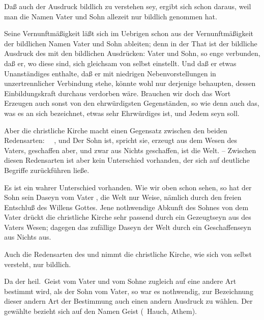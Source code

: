 \begin{aufza}
\item Daß auch der Ausdruck  bildlich zu verstehen sey, ergibt sich schon daraus, weil man die Namen Vater und Sohn allezeit nur bildlich genommen hat.
\item Seine Vernunftmäßigkeit läßt sich im Uebrigen schon aus der Vernunftmäßigkeit der bildlichen Namen Vater und Sohn ableiten; denn in der That ist der bildliche Ausdruck des  mit den bildlichen Ausdrücken: Vater und Sohn, so enge verbunden, daß er, wo diese sind, sich gleichsam von selbst einstellt. Und daß er etwas Unanständiges enthalte, daß er mit niedrigen Nebenvorstellungen in unzertrennlicher Verbindung stehe, könnte wohl nur derjenige behaupten, dessen Einbildungskraft durchaus verdorben wäre. Brauchen wir doch das Wort Erzeugen auch sonst von den ehrwürdigsten Gegenständen, so wie denn auch das, was es an sich bezeichnet, etwas sehr Ehrwürdiges ist, und Jedem seyn soll.
\end{aufza}\par
{} Aber die christliche Kirche macht einen Gegensatz zwischen den beiden Redensarten: ~\ , und  Der Sohn ist, spricht sie, erzeugt aus dem Wesen des Vaters, geschaffen aber, und zwar aus Nichts geschaffen, ist die Welt. -- Zwischen diesen Redensarten ist aber kein Unterschied vorhanden, der sich auf deutliche Begriffe zurückführen ließe.\par
{} Es ist ein wahrer Unterschied vorhanden. Wie wir oben schon sehen, so hat der Sohn sein Daseyn vom Vater , die Welt nur  Weise, nämlich durch den freien Entschluß des Willens Gottes. Jene nothwendige Abkunft des Sohnes von dem Vater drückt die christliche Kirche sehr passend durch ein Gezeugtseyn aus des Vaters Wesen; dagegen das zufällige Daseyn der Welt durch ein Geschaffenseyn aus Nichts aus.

\begin{aufza}
\item Auch die Redensarten des  und  nimmt die christliche Kirche, wie sich von selbst versteht, nur bildlich.
\item Da der heil.\ Geist vom Vater und vom Sohne zugleich auf eine andere Art bestimmt wird, als der Sohn vom Vater, so war es nothwendig, zur Bezeichnung dieser andern Art der Bestimmung auch einen andern Ausdruck zu wählen. Der gewählte bezieht sich auf den Namen Geist (\dh\ Hauch, Athem).
\end{aufza}

